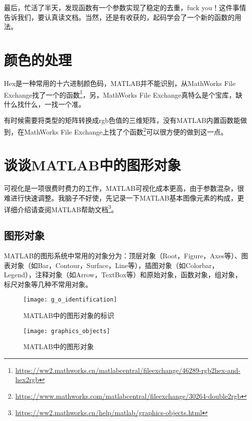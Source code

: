 最后，忙活了半天，发现函数有一个参数实现了稳定的去重，fuck you！这件事情告诉我们，要认真读文档。当然，还是有收获的，起码学会了一个新的函数的用法。


\section{颜色的处理}

Hex是一种常用的十六进制颜色码，MATLAB并不能识别，从MathWorks File Exchange找了一个的函数\footnote{\url{https://ww2.mathworks.cn/matlabcentral/fileexchange/46289-rgb2hex-and-hex2rgb}}，另，MathWorks File Exchange真特么是个宝库，缺什么找什么，一找一个准。

有时候需要将类型的矩阵转换成rgb色值的三维矩阵，没有MATLAB内置函数能做到，在MathWorks File Exchange上找了个函数\footnote{\url{https://www.mathworks.com/matlabcentral/fileexchange/30264-double2rgb}}可以很方便的做到这一点。

\section{谈谈MATLAB中的图形对象}

可视化是一项很费时费力的工作，MATLAB可视化成本更高，由于参数混杂，很难进行快速调整。我脑子不好使，先记录一下MATLAB基本图像元素的构成，更详细介绍请查阅MATLAB帮助文档\footnote{\url{https://ww2.mathworks.cn/help/matlab/graphics-objects.html}}。

\subsection{图形对象}

MATLAB的图形系统中常用的对象分为：顶层对象（Root，Figure，Axes等）、图表对象（如Bar，Contour，Surface，Line等），插图对象（如Colorbar，Legend），注释对象（如Arrow，TextBox等）和原始对象，函数对象，组对象，标尺对象等几种不常用对象。

\begin{figure}
    \centering
    \texttt{[image: g\_o\_identification]}
    \caption{MATLAB中的图形对象的标识}
    \label{g_o_identification}
\end{figure}

\begin{figure}
    \centering
    \texttt{[image: graphics\_objects]}
    \caption{MATLAB中的图形对象}
\end{figure}

